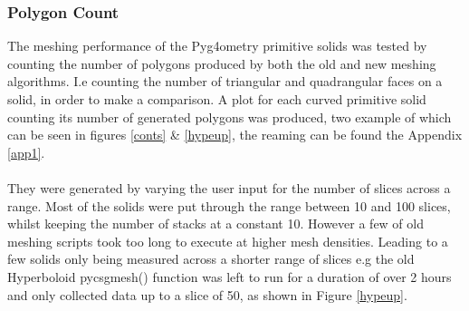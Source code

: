 \documentclass[12pt,a4paper]{article}
\begin{document}
\subsubsection{Polygon Count}
The meshing performance of the Pyg4ometry primitive solids was tested by counting the number of polygons produced by both the old and new meshing algorithms. I.e counting the number of triangular and quadrangular faces on a solid, in order to make a comparison. A plot for each curved primitive solid counting its number of generated polygons was produced, two example of which can be seen in figures \ref{conts} \& \ref{hypeup}, the reaming can be found the Appendix \ref{app1}.
\\\\
They were generated by varying the user input for the number of slices across a range. Most of the solids were put through the range between 10 and 100 slices, whilst keeping the number of stacks at a constant 10. However a few of old meshing scripts took too long to execute at higher mesh densities. Leading to a few solids only being measured across a shorter range of slices e.g the old Hyperboloid pycsgmesh() function was left to run for a duration of over 2 hours and only collected data up to a slice of 50, as shown in Figure \ref{hypeup}.  \\
\end{document}

